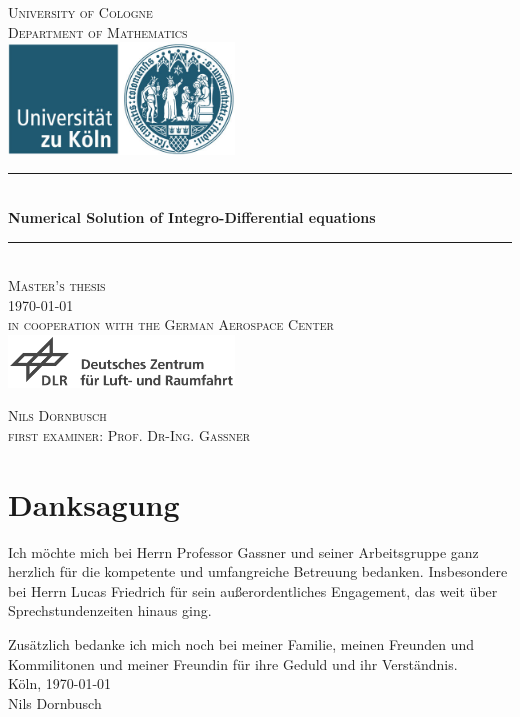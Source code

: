 \documentclass[12pt,a4paper]{scrartcl}
\numberwithin{equation}{section} %
\theoremstyle{definition}
\theoremstyle{plain}
\begin{document}
\begin{titlepage}
\pagestyle{empty}
\begin{center}
\newcommand{\HRule}{\rule{\linewidth}{0.7mm}}
\textsc{\LARGE University of Cologne }\\ [0.4cm]
\textsc{ Department of Mathematics} \\[1.5cm]
\includegraphics[width=0.45\textwidth]{uni}\\[1.5cm]  %
\HRule \\[0.4cm]
{ \huge \bfseries Numerical Solution of Integro-Differential equations}\\[0.4cm]
\HRule \\[1cm]
\textsc{\Large Master's thesis}\\[2mm]
\textsc{\today}\\[10mm]
\textsc{in cooperation with the German Aerospace Center}\\[1.0cm]
\includegraphics[width=0.45\textwidth]{DLR-Logo-full}\\[1.0cm]


  




\begin{center}

\textsc{\Large Nils Dornbusch} \\[3pt]
\textsc{\Large first examiner: Prof. Dr-Ing. Gassner}
\end{center}
\end{center}
\end{titlepage}
\section*{Danksagung}
Ich möchte mich bei Herrn Professor Gassner und seiner Arbeitsgruppe ganz herzlich für die kompetente und umfangreiche Betreuung bedanken. Insbesondere bei Herrn Lucas Friedrich für sein außerordentliches Engagement, das weit über Sprechstundenzeiten hinaus ging. 
\par Zusätzlich bedanke ich mich noch bei meiner Familie, meinen Freunden und Kommilitonen und meiner Freundin für ihre Geduld und ihr Verständnis.
\\[1cm]
Köln, \today 
\\[1cm]
Nils Dornbusch
\newpage
\tableofcontents
\newpage
\end{document}
